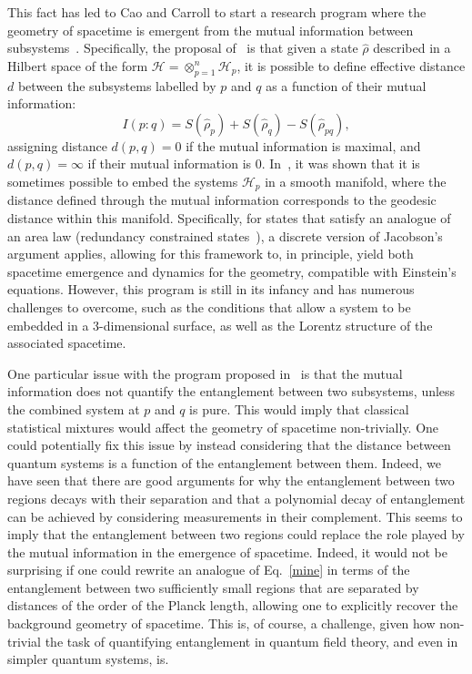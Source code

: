 \documentclass[letterpaper,12pt,titlepage,oneside,final]{book}
\begin{document}
This fact has led to Cao and Carroll to start a research program where the geometry of spacetime is emergent from the mutual information between subsystems~\cite{Cao1,Cao2}. Specifically, the proposal of~\cite{Cao1,Cao2} is that given a state $\hat{\rho}$ described in a Hilbert space of the form $\mathscr{H} = \otimes_{p=1}^n\mathscr{H}_p$, it is possible to define effective distance $d$ between the subsystems labelled by $p$ and $q$ as a function of their mutual information:
\begin{equation}
    I(p\!:\!q) = S(\hat{\rho}_p)+S(\hat{\rho}_q) - S(\hat{\rho}_{pq}),
\end{equation}
assigning distance $d(p,q) = 0$ if the mutual information is maximal, and $d(p,q) = \infty$ if their mutual information is $0$. In~\cite{Cao2}, it was shown that it is sometimes possible to embed the systems $\mathscr{H}_p$ in a smooth manifold, where the distance defined through the mutual information corresponds to the geodesic distance within this manifold. Specifically, for states that satisfy an analogue of an area law (redundancy constrained states~\cite{AreaLawsCirac2008}), a discrete version of Jacobson's argument applies, allowing for this framework to, in principle, yield both spacetime emergence and dynamics for the geometry, compatible with Einstein's equations. However, this program is still in its infancy and has numerous challenges to overcome, such as the conditions that allow a system to be embedded in a 3-dimensional surface, as well as the Lorentz structure of the associated spacetime.

One particular issue with the program proposed in~\cite{Cao2} is that the mutual information does not quantify the entanglement between two subsystems, unless the combined system at $p$ and $q$ is pure. This would imply that classical statistical mixtures would affect the geometry of spacetime non-trivially. One could potentially fix this issue by instead considering that the distance between quantum systems is a function of the entanglement between them. Indeed, we have seen that there are good arguments for why the entanglement between two regions decays with their separation and that a polynomial decay of entanglement can be achieved by considering measurements in their complement. This seems to imply that the entanglement between two regions could replace the role played by the mutual information in the emergence of spacetime. Indeed, it would not be surprising if one could rewrite an analogue of Eq.~\eqref{mine} in terms of the entanglement between two sufficiently small regions that are separated by distances of the order of the Planck length, allowing one to explicitly recover the background geometry of spacetime. This is, of course, a challenge, given how non-trivial the task of quantifying entanglement in quantum field theory, and even in simpler quantum systems, is.
\end{document}
